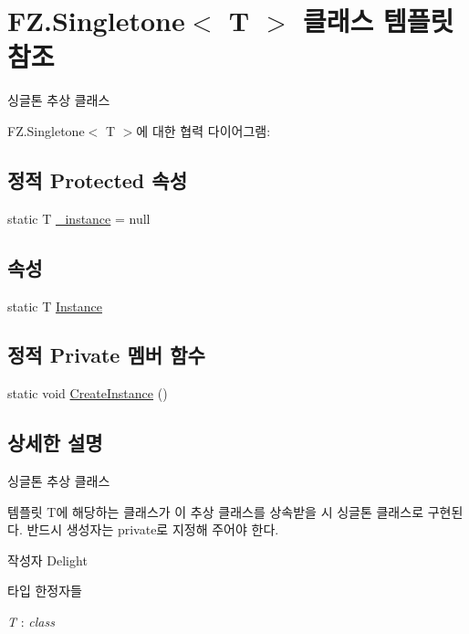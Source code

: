 \hypertarget{class_f_z_1_1_singletone}{}\section{F\+Z.\+Singletone$<$ T $>$ 클래스 템플릿 참조}
\label{class_f_z_1_1_singletone}


싱글톤 추상 클래스  




F\+Z.\+Singletone$<$ T $>$에 대한 협력 다이어그램\+:
\subsection*{정적 Protected 속성}
\begin{DoxyCompactItemize}
\item 
static T \hyperlink{class_f_z_1_1_singletone_a1da3d44c1904d88e6fc0252c9333c221}{\+\_\+instance} = null
\end{DoxyCompactItemize}
\subsection*{속성}
\begin{DoxyCompactItemize}
\item 
static T \hyperlink{class_f_z_1_1_singletone_a8e7ba3cf5cff48b1101428beefcd76b4}{Instance}
\end{DoxyCompactItemize}
\subsection*{정적 Private 멤버 함수}
\begin{DoxyCompactItemize}
\item 
static void \hyperlink{class_f_z_1_1_singletone_a9e386b925c431c4ddd71a0c4e86e8a08}{Create\+Instance} ()
\end{DoxyCompactItemize}


\subsection{상세한 설명}
싱글톤 추상 클래스 

템플릿 T에 해당하는 클래스가 이 추상 클래스를 상속받을 시 싱글톤 클래스로 구현된다. 반드시 생성자는 private로 지정해 주어야 한다. \begin{DoxyAuthor}{작성자}
Delight 
\end{DoxyAuthor}
\begin{Desc}
\item[타입 한정자들]\begin{description}
\item[{\em T} : {\em class}]\end{description}
\end{Desc}


